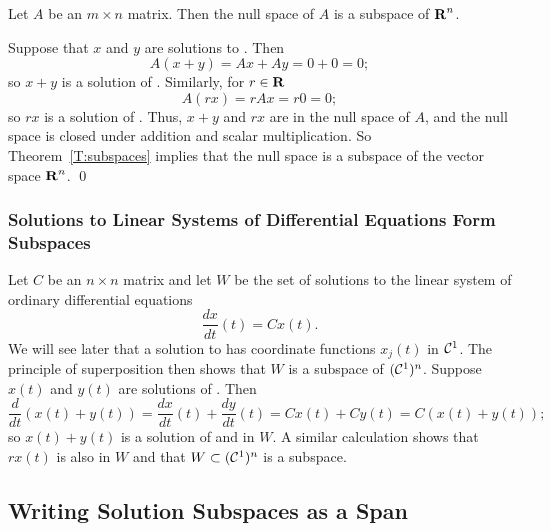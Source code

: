 \begin{lemma}
Let $A$ be an $m\times n$ matrix.  Then the null space of $A$
is a subspace of $\mbox{$\bf{R}$}^n$.
\end{lemma}

\proof
Suppose that $x$ and $y$ are solutions to .  Then
\[
A(x+y) = Ax+Ay = 0+0 = 0;
\]
so $x+y$ is a solution of .  Similarly, for $r\in\mbox{$\bf{R}$}$
\[
A(rx) = rAx = r0 = 0;
\]
so $rx$ is a solution of .  Thus, $x+y$ and $rx$ are
in the null space of $A$, and the null space is closed under addition 
and scalar multiplication.  So Theorem~\ref{T:subspaces} implies that
the null space is a subspace of the vector space $\mbox{$\bf{R}$}^n$.   \qed

\subsubsection*{Solutions to Linear Systems of Differential Equations Form
Subspaces}

Let $C$ be an $n\times n$ matrix and let $W$ be the set of solutions to
the linear system of ordinary differential equations
\begin{equation} \label{Cx(t)}
\frac{dx}{dt}(t) = Cx(t).
\end{equation}
We will see later that a solution to  has coordinate
functions $x_j(t)$ in ${\cal C}^1$.  The principle of superposition
then shows that $W$ is a subspace of $({\cal C}^1)^n$.  Suppose
$x(t)$ and $y(t)$ are solutions of .  Then
\[
\frac{d}{dt}(x(t)+y(t)) = \frac{dx}{dt}(t) + \frac{dy}{dt}(t) =
Cx(t) + Cy(t) = C(x(t)+y(t));
\]
so $x(t)+y(t)$ is a solution of  and in $W$.  A
similar calculation shows that $rx(t)$ is also in $W$ and
that $W\subset({\cal C}^1)^n$ is a subspace.


\subsection*{Writing Solution Subspaces as a Span}

